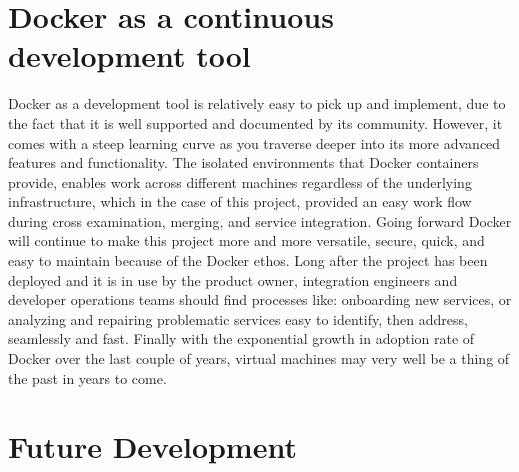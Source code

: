 \section{Docker as a continuous development tool}
Docker as a development tool is relatively easy to pick up and implement, due to the fact that it is well supported and documented by its community. However, it comes with a steep learning curve as you traverse deeper into its more advanced features and functionality. The isolated environments that Docker containers provide, enables work across different machines regardless of the underlying infrastructure, which in the case of this project, provided an easy work flow during cross examination, merging, and service integration. Going forward Docker will continue to make this project more and more versatile, secure, quick, and easy to maintain because of the Docker ethos. Long after the project has been deployed and it is in use by the product owner, integration engineers and developer operations teams should find processes like: onboarding new services, or analyzing and repairing problematic services easy to identify, then address, seamlessly and fast. Finally with the exponential growth in adoption rate of Docker over the last couple of years, virtual machines may very well be a thing of the past in years to come.

\section{Future Development}


